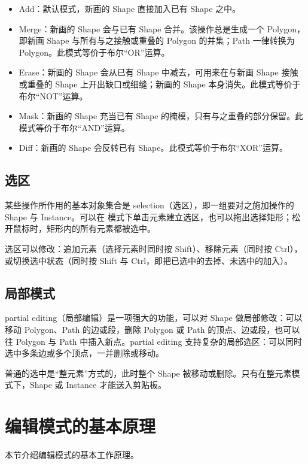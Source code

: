 \begin{itemize}
\item Add：默认模式，新画的 Shape 直接加入已有 Shape 之中。
\item Merge：新画的 Shape 会与已有 Shape 合并。该操作总是生成一个 Polygon，即新画 Shape 与所有与之接触或重叠的 Polygon 的并集；Path 一律转换为 Polygon。此模式等价于布尔“OR”运算。
\item Erase：新画的 Shape 会从已有 Shape 中减去，可用来在与新画 Shape 接触或重叠的 Shape 上开出缺口或细缝；新画的 Shape 本身消失。此模式等价于布尔“NOT”运算。
\item Mask：新画的 Shape 充当已有 Shape 的掩模，只有与之重叠的部分保留。此模式等价于布尔“AND”运算。
\item Diff：新画的 Shape 会反转已有 Shape。此模式等价于布尔“XOR”运算。
\end{itemize}

\subsection{选区}\label{sec:editor_selection}

某些操作所作用的基本对象集合是 selection（选区），即一组要对之施加操作的 Shape 与 Instance。可以在  模式下单击元素建立选区，也可以拖出选择矩形；松开鼠标时，矩形内的所有元素都被选中。

选区可以修改：追加元素（选择元素时同时按 Shift）、移除元素（同时按 Ctrl），或切换选中状态（同时按 Shift 与 Ctrl，即把已选中的去掉、未选中的加入）。

\subsection{局部模式}\label{sec:partial_vs_full}

partial editing（局部编辑）是一项强大的功能，可以对 Shape 做局部修改：可以移动 Polygon、Path 的边或段，删除 Polygon 或 Path 的顶点、边或段，也可以往 Polygon 与 Path 中插入新点。partial editing 支持复杂的局部选区：可以同时选中多条边或多个顶点，一并删除或移动。

普通的选中是“整元素”方式的，此时整个 Shape 被移动或删除。只有在整元素模式下，Shape 或 Instance 才能送入剪贴板。

\section{编辑模式的基本原理}\label{sec:editor_basics}

本节介绍编辑模式的基本工作原理。

